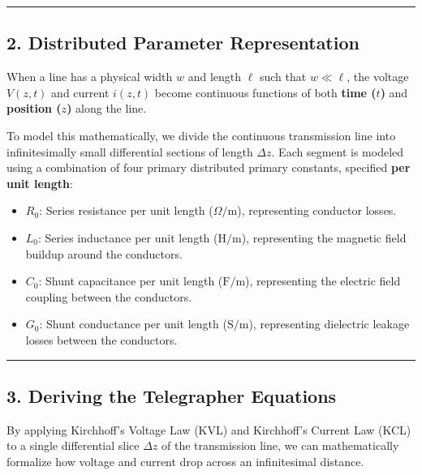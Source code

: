 \documentclass[
]{article}
\providecommand{\tightlist}{%
  \setlength{\itemsep}{0pt}\setlength{\parskip}{0pt}}
\begin{document}
\begin{center}\rule{0.5\linewidth}{0.5pt}\end{center}

\subsection{2. Distributed Parameter
Representation}\label{distributed-parameter-representation}

When a line has a physical width \(w\) and length \(\ell\) such that
\(w \ll \ell\), the voltage \(V(z,t)\) and current \(i(z,t)\) become
continuous functions of both \textbf{time (\(t\))} and \textbf{position
(\(z\))} along the line.

To model this mathematically, we divide the continuous transmission line
into infinitesimally small differential sections of length \(\Delta z\).
Each segment is modeled using a combination of four primary distributed
primary constants, specified \textbf{per unit length}:

\begin{itemize}
\tightlist
\item
  \(R_0\): Series resistance per unit length (\(\Omega/\text{m}\)),
  representing conductor losses.
\item
  \(L_0\): Series inductance per unit length (\(\text{H/m}\)),
  representing the magnetic field buildup around the conductors.
\item
  \(C_0\): Shunt capacitance per unit length (\(\text{F/m}\)),
  representing the electric field coupling between the conductors.
\item
  \(G_0\): Shunt conductance per unit length (\(\text{S/m}\)),
  representing dielectric leakage losses between the conductors.
\end{itemize}

\begin{center}\rule{0.5\linewidth}{0.5pt}\end{center}

\subsection{3. Deriving the Telegrapher
Equations}\label{deriving-the-telegrapher-equations}

By applying Kirchhoff's Voltage Law (KVL) and Kirchhoff's Current Law
(KCL) to a single differential slice \(\Delta z\) of the transmission
line, we can mathematically formalize how voltage and current drop
across an infinitesimal distance.
\end{document}

